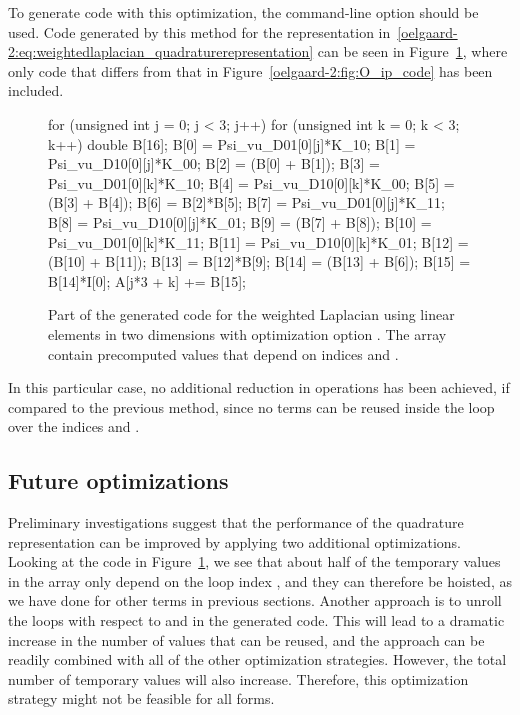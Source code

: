 To generate code with this optimization, the \ffc{} command-line
option  should be used.  Code
generated by this method for the representation
in~\eqref{oelgaard-2:eq:weightedlaplacian_quadraturerepresentation}
can be seen in Figure~\ref{oelgaard-2:fig:O_basis_code}, where only
code that differs from that in Figure~\ref{oelgaard-2:fig:O_ip_code}
has been included.

\begin{figure}
\begin{c++}
for (unsigned int j = 0; j < 3; j++)
{
  for (unsigned int k = 0; k < 3; k++)
  {
    double B[16];
    B[0] = Psi_vu_D01[0][j]*K_10;
    B[1] = Psi_vu_D10[0][j]*K_00;
    B[2] = (B[0] + B[1]);
    B[3] = Psi_vu_D01[0][k]*K_10;
    B[4] = Psi_vu_D10[0][k]*K_00;
    B[5] = (B[3] + B[4]);
    B[6] = B[2]*B[5];
    B[7] = Psi_vu_D01[0][j]*K_11;
    B[8] = Psi_vu_D10[0][j]*K_01;
    B[9] = (B[7] + B[8]);
    B[10] = Psi_vu_D01[0][k]*K_11;
    B[11] = Psi_vu_D10[0][k]*K_01;
    B[12] = (B[10] + B[11]);
    B[13] = B[12]*B[9];
    B[14] = (B[13] + B[6]);
    B[15] = B[14]*I[0];
    A[j*3 + k] += B[15];
  }
}
\end{c++}
\caption{Part of the generated code for the weighted Laplacian using
  linear elements in two dimensions with optimization option . The array  contain precomputed
  values that depend on indices  and .}
\label{oelgaard-2:fig:O_basis_code}
\end{figure}

In this particular case, no additional reduction in operations has
been achieved, if compared to the previous method, since no terms can
be reused inside the loop over the indices  and .

\subsection{Future optimizations}

Preliminary investigations suggest that the performance of the
quadrature representation can be improved by applying two additional
optimizations.  Looking at the code in
Figure~\ref{oelgaard-2:fig:O_basis_code}, we see that about half of
the temporary values in the array  only depend on the loop
index , and they can therefore be hoisted, as we have done for
other terms in previous sections.  Another approach is to unroll the
loops with respect to  and  in the generated code.  This
will lead to a dramatic increase in the number of values that can be
reused, and the approach can be readily combined with all of the other
optimization strategies. However, the total number of temporary values
will also increase. Therefore, this optimization strategy might not be
feasible for all forms.

